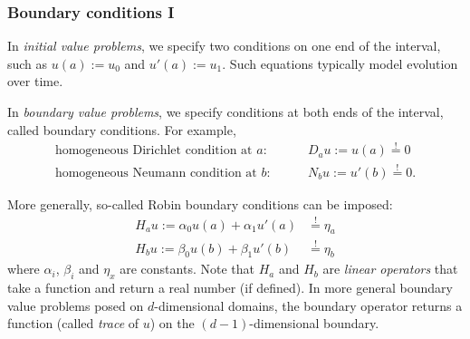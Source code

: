 \documentclass[12pt,a4paper]{article}
\begin{document}
    
    \subsubsection*{Boundary conditions I}
    
    
    In \emph{initial value problems},
    we specify two conditions
    on one end of the interval, 
    such as
    $
        u(a) := u_0
    $
    and
    $
        u'(a) := u_1
    $.
    Such equations typically model evolution over time.
    
    
    In \emph{boundary value problems}, 
    we specify conditions at both ends of the interval,
    called boundary conditions.
    For example,
    \begin{subequations}\begin{align}
        \text{homogeneous Dirichlet condition at $a$}:
        & 
        \qquad
        D_a u := u(a) \stackrel{!}{=} 0
        \\
        \text{homogeneous Neumann condition at $b$}:
        &
        \qquad
        N_b u := u'(b) \stackrel{!}{=} 0
        .
    \end{align}\end{subequations}
    
    
    More generally,
    so-called
    Robin boundary conditions can be imposed:
    \begin{subequations}
        \label{e:H}
        \begin{align}
            H_a u := \alpha_0 u(a) + \alpha_1 u'(a) & \stackrel{!}{=} \eta_a
            \\
            H_b u := \beta_0 u(b) + \beta_1 u'(b) & \stackrel{!}{=} \eta_b
        \end{align}
    \end{subequations}
    where 
    $\alpha_i$, $\beta_i$ and $\eta_x$ are constants.
    Note that $H_a$ and $H_b$ are
    \emph{linear operators}
    that take a function 
    and return a real number (if defined).
    In more general boundary value problems
    posed on $d$-dimensional domains,
    the boundary operator
    returns a function (called \emph{trace} of $u$) 
    on the $(d - 1)$-dimensional boundary.
    
\end{document}
